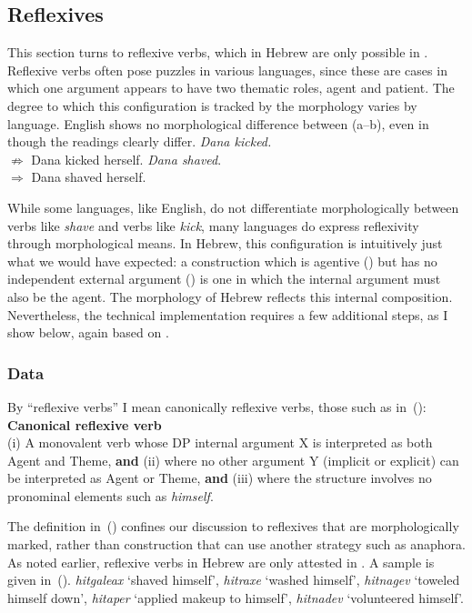 {	\subsection{Reflexives} \label{vz:va:refl}
This section turns to reflexive verbs, which in Hebrew are only possible in {\thit}. Reflexive verbs often pose puzzles in various languages, since these are cases in which one argument appears to have two thematic roles, agent and patient. The degree to which this configuration is tracked by the morphology varies by language. English shows no morphological difference between (\nextx a--b), even in though the readings clearly differ.
\pex \a \emph{Dana kicked.}\\
		$\nRightarrow$ Dana kicked herself.
	\a \emph{Dana shaved}.\\
		$\Rightarrow$ Dana shaved herself.
\xe

While some languages, like English, do not differentiate morphologically between verbs like \emph{shave} and verbs like \emph{kick}, many languages do express reflexivity through morphological means. In Hebrew, this configuration is intuitively just what we would have expected: a construction which is agentive (\va) but has no independent external argument (\vz) is one in which the internal argument must also be the agent. The morphology of Hebrew reflects this internal composition. Nevertheless, the technical implementation requires a few additional steps, as I show below, again based on \citep{kastner17gjgl}.

		\subsubsection{Data}
By ``reflexive verbs'' I mean canonically reflexive verbs, those such as in~(\nextx):
\ex \textbf{Canonical reflexive verb}\\
	(i) A monovalent verb whose DP internal argument X is interpreted as both Agent and Theme, \textbf{and} (ii) where no other argument Y (implicit or explicit) can be interpreted as Agent or Theme, \textbf{and} (iii) where the structure involves no pronominal elements such as \emph{himself}.
\xe

The definition in~(\lastx) confines our discussion to reflexives that are morphologically marked, rather than construction that can use another strategy such as anaphora. As noted earlier, reflexive verbs in Hebrew are only attested in \thit. A sample is given in~(\nextx).
\ex\label{ex:refl}\emph{hitgaleax} `shaved himself', \emph{hitraxe\texttslig} `washed himself', \emph{hitnagev} `toweled himself down', \emph{hitaper} `applied makeup to himself', \emph{hitnadev} `volunteered himself'.
\xe

}
